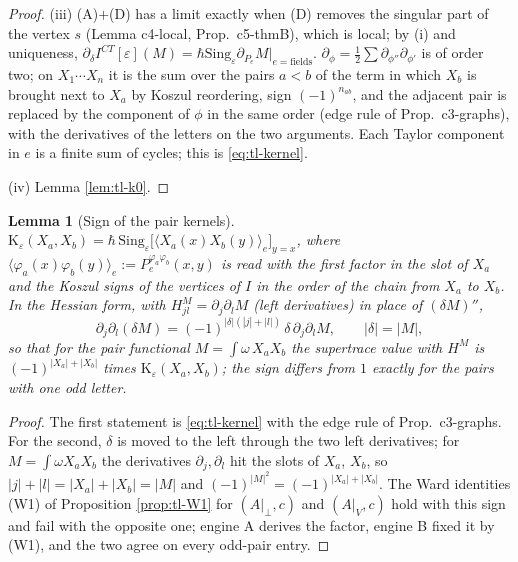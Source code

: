 \documentclass[11pt]{article}
\numberwithin{equation}{section}
\theoremstyle{plain}
\newtheorem{lemma}[theorem]{Lemma}
\theoremstyle{definition}
\begin{document}
\begin{proof}
(iii) (A)$+$(D) has a limit exactly when (D) removes the singular part of the vertex $s$ (Lemma c4-local, Prop.~c5-thmB), which is local; by (i) and uniqueness, $\partial_\delta I^{CT}[\varepsilon](M)=\hbar\mathrm{Sing}_\varepsilon\partial_{P_e}M|_{e=\text{fields}}$. $\partial_\phi=\tfrac12\sum\partial_{\phi''}\partial_{\phi'}$ is of order two; on $X_1\cdots X_n$ it is the sum over the pairs $a<b$ of the term in which $X_b$ is brought next to $X_a$ by Koszul reordering, sign $(-1)^{n_{ab}}$, and the adjacent pair is replaced by the component of $\phi$ in the same order (edge rule of Prop.~c3-graphs), with the derivatives of the letters on the two arguments. Each Taylor component in $e$ is a finite sum of cycles; this is \eqref{eq:tl-kernel}.

(iv) Lemma \ref{lem:tl-k0}.
\end{proof}

\begin{lemma}[Sign of the pair kernels]
\label{lem:tl-sign}
$\mathrm K_\varepsilon(X_a,X_b)=\hbar\,\mathrm{Sing}_\varepsilon\big[\langle X_a(x)X_b(y)\rangle_e\big]_{y=x}$, where $\langle\varphi_a(x)\varphi_b(y)\rangle_e:=P_e^{\varphi_a\varphi_b}(x,y)$ is read with the first factor in the slot of $X_a$ and the Koszul signs of the vertices of $I$ in the order of the chain from $X_a$ to $X_b$. In the Hessian form, with $H^M_{jl}=\partial_j\partial_lM$ (left derivatives) in place of $(\delta M)''$,
\[
\partial_j\partial_l(\delta M)=(-1)^{|\delta|(|j|+|l|)}\,\delta\,\partial_j\partial_lM,\qquad |\delta|=|M|,
\]
so that for the pair functional $M=\int\omega\,X_aX_b$ the supertrace value with $H^M$ is $(-1)^{|X_a|+|X_b|}$ times $\mathrm K_\varepsilon(X_a,X_b)$; the sign differs from $1$ exactly for the pairs with one odd letter.
\end{lemma}

\begin{proof}
The first statement is \eqref{eq:tl-kernel} with the edge rule of Prop.~c3-graphs. For the second, $\delta$ is moved to the left through the two left derivatives; for $M=\int\omega X_aX_b$ the derivatives $\partial_j,\partial_l$ hit the slots of $X_a$, $X_b$, so $|j|+|l|=|X_a|+|X_b|=|M|$ and $(-1)^{|M|^2}=(-1)^{|X_a|+|X_b|}$. The Ward identities (W1) of Proposition \ref{prop:tl-W1} for $(A|_\perp,c)$ and $(A|_V,c)$ hold with this sign and fail with the opposite one; engine A derives the factor, engine B fixed it by (W1), and the two agree on every odd-pair entry.
\end{proof}
\end{document}
